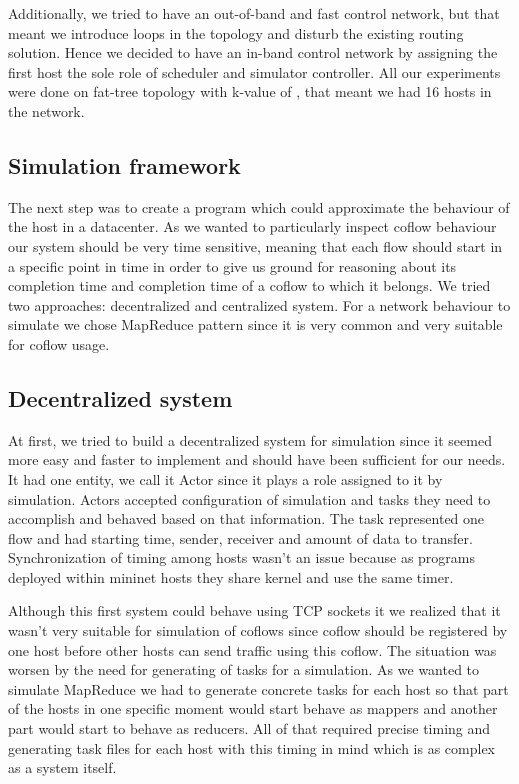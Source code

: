 \documentclass[conference]{IEEEtran}
\begin{document}
Additionally, we tried to have an out-of-band and fast control network, but that meant we introduce loops in the topology and disturb the existing routing solution. Hence we decided to have an in-band control network by assigning the first host the sole role of scheduler and simulator controller. All our experiments were done on fat-tree topology with k-value of , that meant we had 16 hosts in the network.

\subsection{Simulation framework}
The next step was to create a program which could approximate the behaviour of the host in a datacenter. As we wanted to particularly inspect coflow behaviour our system should be very time sensitive, meaning that each flow should start in a specific point in time in order to give us ground for reasoning about its completion time and completion time of a coflow to which it belongs. We tried two approaches: decentralized and centralized system. For a network behaviour to simulate we chose MapReduce pattern since it is very common and very suitable for coflow usage.

\subsection{Decentralized system}
At first, we tried to build a decentralized system for simulation since it seemed more easy and faster to implement and should have been sufficient for our needs. It had one entity, we call it Actor since it plays a role assigned to it by simulation. Actors accepted configuration of simulation and tasks they need to accomplish and behaved based on that information. The task represented one flow and had starting time, sender, receiver and amount of data to transfer. Synchronization of timing among hosts wasn’t an issue because as programs deployed within mininet hosts they share kernel and use the same timer. 

Although this first system could behave using TCP sockets it we realized that it wasn’t very suitable for simulation of coflows since coflow should be registered by one host before other hosts can send traffic using this coflow. The situation was worsen by the need for generating of tasks for a simulation. As we wanted to simulate MapReduce we had to generate concrete tasks for each host so that part of the hosts in one specific moment would start behave as mappers and another part would start to behave as reducers. All of that required precise timing and generating task files for each host with this timing in mind which is as complex as a system itself.
\end{document}
